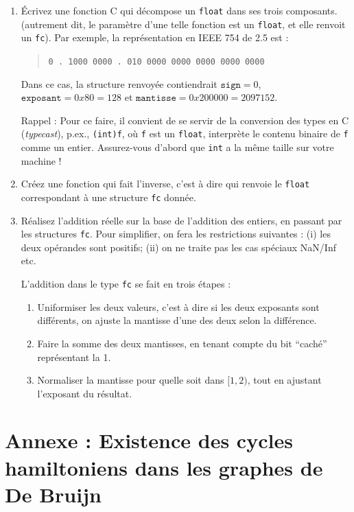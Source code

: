 \documentclass[11pt]{article}
\begin{document}
\begin{enumerate}
\item Écrivez une fonction C qui d\'ecompose un \verb+float+
  dans ses trois composants. (autrement dit, le paramètre d'une telle
  fonction est un \texttt{float}, et elle renvoit un \verb+fc+).
  Par exemple, la représentation en IEEE 754 de 2.5 est :
\begin{quote}
\verb+0 . 1000 0000 . 010 0000 0000 0000 0000 0000+
\end{quote}
Dans ce cas, la structure renvoyée contiendrait $\mathtt{sign}=0$,
$\mathtt{exposant}=0x80=128$ et $\mathtt{mantisse}=0x200000=2097152$.

Rappel : Pour ce faire, il convient de se servir de la conversion des
types en C (\emph{typecast}), p.ex., \texttt{(int)f}, où \texttt{f}
est un \texttt{float}, interprète le contenu binaire de \texttt{f} comme 
un entier. Assurez-vous d'abord que \texttt{int} a la même taille
sur votre machine !

\item Créez une fonction qui fait l'inverse, c'est à dire qui renvoie
  le \texttt{float} correspondant à une structure \verb+fc+ donn\'ee.

\item Réalisez l'addition réelle sur la base de l'addition des entiers,
  en passant par les structures \verb+fc+. Pour simplifier, on fera les
  restrictions suivantes : (i) les deux opérandes sont positifs;
  (ii) on ne traite pas les cas spéciaux NaN/Inf etc.

L'addition dans le type \verb+fc+ se fait en trois étapes :
\begin{enumerate}
\item Uniformiser les deux valeurs, c'est à dire si les deux exposants sont
  différents, on ajuste la mantisse d'une des deux selon la
  différence.
\item Faire la somme des deux mantisses, en tenant compte du bit ``caché''
  représentant la 1.
\item Normaliser la mantisse pour quelle soit dans $[1,2)$, tout en ajustant
  l'exposant du résultat.
\end{enumerate}

\end{enumerate}




\appendix

\section*{Annexe : Existence des cycles hamiltoniens dans les graphes de De Bruijn}
\end{document}
